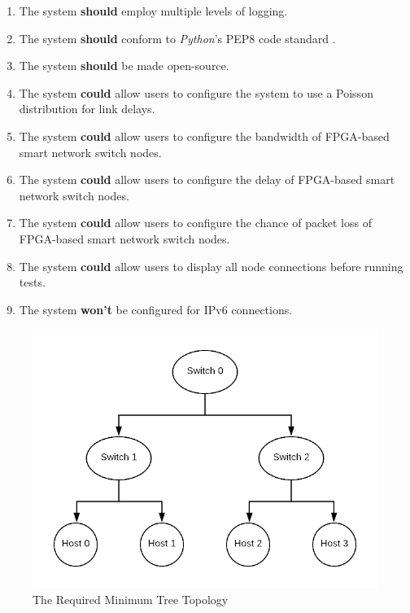 \begin{enumerate}[label=\textbf{F\arabic*:}]
  \item The system \textbf{should} employ multiple levels of logging.
  \item The system \textbf{should} conform to \textit{Python}'s PEP8 code standard \cite{python_pep8}.
  \item The system \textbf{should} be made open-source.
  \item The system \textbf{could} allow users to configure the system to use a Poisson distribution for link delays.
  \item The system \textbf{could} allow users to configure the bandwidth of FPGA-based smart network switch nodes.
  \item The system \textbf{could} allow users to configure the delay of FPGA-based smart network switch nodes.
  \item The system \textbf{could} allow users to configure the chance of packet loss of FPGA-based smart network switch nodes.
  \item The system \textbf{could} allow users to display all node connections before running tests.
  \item The system \textbf{won't} be configured for IPv6 connections.
\end{enumerate}


\begin{figure}[t]
  \centering
  \includegraphics[width=\textwidth]{assets/minimum_tree.png}
  \caption{The Required Minimum Tree Topology}
  \label{minimum_tree}
\end{figure}

